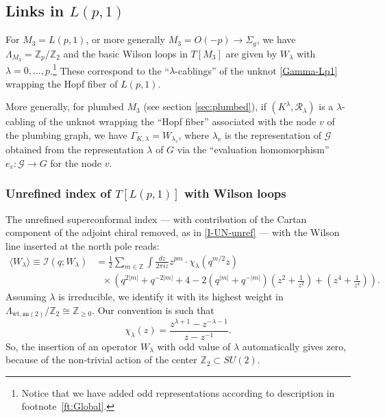 \documentclass[hyper,letterpaper]{JHEP3}
\newcommand{\be}{\begin{equation}}
\newcommand{\ee}{\end{equation}}
\newcommand{\Z}{{\mathbb Z}}
\def\frak{\mathfrak}
\def\CG{{\mathcal G}}
\def\CI{{\mathcal I}}
\def\CR{{\mathcal R}}
\def\la{\lambda}
\begin{document}
\subsection{Links in $L(p,1)$}

For $M_3=L(p,1)$, or more generally $M_3=O(-p)\rightarrow \Sigma_g$, we have $\Lambda_{M_3}= \Z_p/\Z_2$
and the basic Wilson loops in $T[M_3]$ are given by $W_{\lambda}$ with $\lambda=0,\ldots, p$.\footnote{Notice that we have added odd representations according to description in footnote~\ref{ft:Global}.}
These correspond to the ``$\lambda$-cablings'' of the unknot \eqref{Gamma-Lp1} wrapping the Hopf fiber of $L(p,1)$.

More generally, for plumbed $M_3$ (see section \ref{sec:plumbed}), if $(K^{\lambda}, \CR_{\lambda})$
is a $\lambda$-cabling of the unknot wrapping the ``Hopf fiber'' associated with the node $v$ of the plumbing graph,
we have $\Gamma_{K,\la}{=}W_{\lambda_v}$, where $\lambda_v$ is the representation of $\CG$ obtained from
the representation $\la$ of $G$ via the ``evaluation homomorphism'' $e_v: \CG\rightarrow G$ for the node $v$.

\subsubsection{Unrefined index of ${T[L(p,1)]}$ with Wilson loops}
\label{sec:LensWilson}

The unrefined superconformal index --- with contribution of the Cartan component of the adjoint chiral removed, as in \eqref{I-UN-unref} --- with the Wilson line inserted at the north pole reads:
\begin{equation}\label{SU2Int}
\begin{aligned}
\langle W_\la \rangle\equiv 	\CI(q;W_\lambda) & =  \frac{1}{2} \sum_{m \in \mathbb{Z}} \int \frac{dz}{2\pi i z} z^{ p m}\cdot \chi_\lambda(q^{m/2}z)\\
&\ \ \ \times \left( q^{2 \left| m \right|}+q^{-2 \left| m \right|}+4 - 2 \left(q^{ \left| m \right|}+q^{- \left| m \right|} \right) \left( z^2 +\frac{1}{z^2} \right)+\left( z^4+\frac{1}{z^4} \right) \right).
\end{aligned}
\end{equation}
Assuming $\lambda$ is irreducible, we identify it with its highest weight in $\Lambda_{\text{wt},\frak{su}(2)}/\Z_2 \cong \Z_{\geq 0}$.
Our convention is such that
\be
\chi_{\lambda}(z)=\frac{z^{\lambda+1}-z^{-\lambda-1}}{z-z^{-1}}.
\ee
So, the insertion of an operator $W_\lambda$ with odd value of $\lambda$ automatically gives zero,
because of the non-trivial action of the center $\Z_2 \subset SU(2)$.
\end{document}
